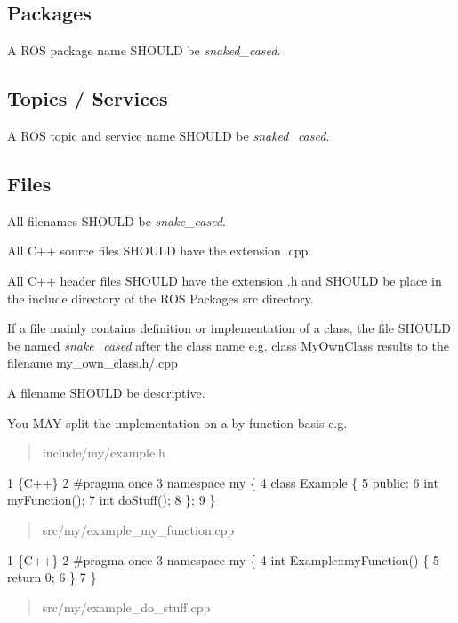 \subsection*{Packages}

A R\+OS package name S\+H\+O\+U\+LD be {\itshape snaked\+\_\+cased}.

\subsection*{Topics / Services}

A R\+OS topic and service name S\+H\+O\+U\+LD be {\itshape snaked\+\_\+cased}.

\subsection*{Files}

All filenames S\+H\+O\+U\+LD be {\itshape snake\+\_\+cased}.

All C++ source files S\+H\+O\+U\+LD have the extension {\ttfamily .cpp}.

All C++ header files S\+H\+O\+U\+LD have the extension {\ttfamily .h} and S\+H\+O\+U\+LD be place in the {\ttfamily include} directory of the R\+OS Packages {\ttfamily src} directory.

If a file mainly contains definition or implementation of a class, the file S\+H\+O\+U\+LD be named {\itshape snake\+\_\+cased} after the class name e.\+g. {\ttfamily class My\+Own\+Class} results to the filename {\ttfamily my\+\_\+own\+\_\+class.\+h/.cpp}

A filename S\+H\+O\+U\+LD be descriptive.

You M\+AY split the implementation on a by-\/function basis e.\+g. \begin{quote}
include/my/example.\+h \end{quote}



\begin{DoxyCode}
1 \{C++\}
2 #pragma once
3 namespace my \{
4     class Example \{
5         public:
6         int myFunction();
7         int doStuff();
8     \};
9 \}
\end{DoxyCode}
 \begin{quote}
src/my/example\+\_\+my\+\_\+function.\+cpp \end{quote}



\begin{DoxyCode}
1 \{C++\}
2 #pragma once
3 namespace my \{
4     int Example::myFunction() \{
5         return 0;
6     \}
7 \}
\end{DoxyCode}
 \begin{quote}
src/my/example\+\_\+do\+\_\+stuff.\+cpp \end{quote}



